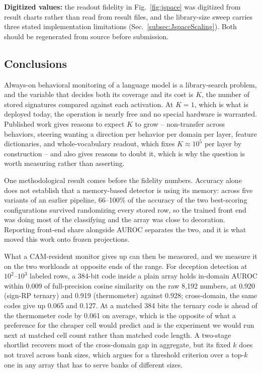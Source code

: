 \documentclass[conference]{IEEEtran}
\newcommand{\cam}{{CAM}\xspace}
\newcommand{\auroc}{{AUROC}\xspace}
\newcommand{\signrp}{{sign-RP}\xspace}
\begin{document}
\textbf{Digitized values:} the readout fidelity in
Fig.~\ref{fig:jspace} was digitized from result charts rather than read
from result files, and the library-size sweep carries three stated
implementation limitations (Sec.~\ref{subsec:JspaceScaling}). Both
should be regenerated from source before submission.

\subsection{Conclusions}
\label{subsec:Conclusions}
Always-on behavioral monitoring of a language model is a library-search
problem, and the variable that decides both its coverage and its cost is
$K$, the number of stored signatures compared against each activation. At
$K=1$, which is what is deployed today, the operation is nearly free and
no special hardware is warranted. Published work gives reasons to expect
$K$ to grow -- non-transfer across behaviors, steering wanting a
direction per behavior per domain per layer, feature dictionaries, and
whole-vocabulary readout, which fixes $K\!\approx\!10^{5}$ per layer by
construction -- and also gives reasons to doubt it, which is why the
question is worth measuring rather than asserting.

One methodological result comes before the fidelity numbers. Accuracy
alone does not establish that a memory-based detector is using its
memory: across five variants of an earlier pipeline, 66--100\% of the
accuracy of the two best-scoring configurations survived randomizing
every stored row, so the trained front end was doing most of the
classifying and the array was close to decoration. Reporting front-end
share alongside \auroc separates the two, and it is what moved this work
onto frozen projections.

What a \cam-resident monitor gives up can then be measured, and we
measure it on the two workloads at opposite ends of the range. For
deception detection at $10^{2}$--$10^{3}$ labeled rows, a 384-bit code
inside a plain array holds in-domain \auroc within 0.009 of
full-precision cosine similarity on the raw 8{,}192 numbers, at 0.920
(\signrp ternary) and 0.919 (thermometer) against 0.928; cross-domain,
the same codes give up 0.065 and 0.127. At a matched 384 bits the
ternary code is ahead of the thermometer code by 0.061 on average, which
is the opposite of what a preference for the cheaper cell would predict
and is the experiment we would run next at matched cell count rather
than matched code length. A two-stage shortlist recovers most of the
cross-domain gap in aggregate, but its fixed $k$ does not travel across
bank sizes, which argues for a threshold criterion over a top-$k$ one in
any array that has to serve banks of different sizes.
\end{document}

